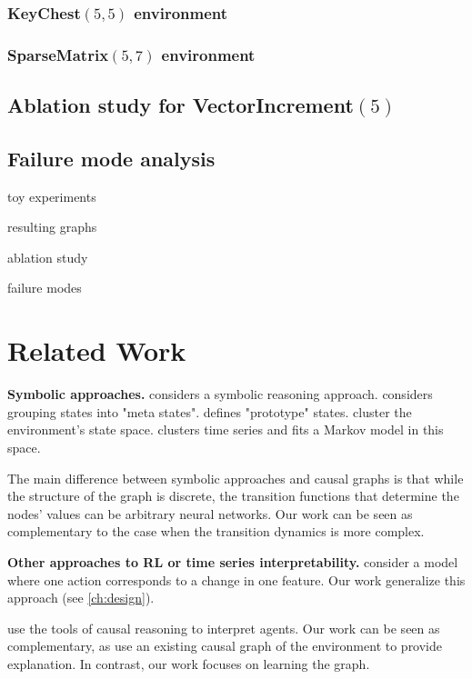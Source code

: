 \documentclass[a4paper,11pt,oneside]{report}
\begin{document}
\subsection{KeyChest$(5, 5)$ environment}
\subsection{SparseMatrix$(5, 7)$ environment}

\section{Ablation study for VectorIncrement$(5)$}

\section{Failure mode analysis}

toy experiments

resulting graphs

ablation study

failure modes



\chapter{Related Work}
\label{ch:related_work}

{\bf Symbolic approaches.}
\cite{Ave, DesJardins1993,Evans2018} considers a symbolic reasoning approach. \cite{Jonsson2006} considers grouping states into "meta states". \cite{Corneil2018} defines "prototype" states.
\cite{Yarats2016} cluster the environment's state space.
\cite{Fortuin2018} clusters time series and fits a Markov model in this space.

The main difference between symbolic approaches and causal graphs is that while the structure of the graph is discrete, the transition functions that determine the nodes' values can be arbitrary neural networks. Our work can be seen as complementary to the case when the transition dynamics is more complex.

{\bf Other approaches to RL or time series interpretability.}
\cite{Thomas2018} consider a model where one action corresponds to a change in one feature. Our work generalize this approach (see \autoref{ch:design}).

\cite{Everitt2019,Martic2020,Madumal2019} use the tools of causal reasoning to interpret agents. Our work can be seen as complementary, as \cite{Everitt2019,Martic2020,Madumal2019} use an existing causal graph of the environment to provide explanation. In contrast, our work focuses on learning the graph.
\end{document}
